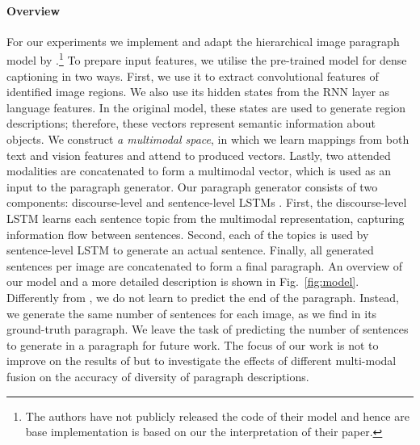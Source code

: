 \documentclass[11pt,a4paper]{article}
\begin{document}
\paragraph{Overview}
For our experiments we implement and adapt the hierarchical image paragraph model by \citet{krause2016hierarchical}.\footnote{The authors have not publicly released the code of their model and hence are base implementation is based on our the interpretation of their paper.}
To prepare input features, we utilise the pre-trained model for dense captioning \cite{densecap} in two ways.
First, we use it to extract convolutional features of identified image regions.
We also use its hidden states from the RNN layer as language features.
In the original model, these states are used to generate region descriptions; therefore, these vectors represent semantic information about objects.
We construct \textit{a multimodal space}, in which we learn mappings from both text and vision features and attend to produced vectors.
Lastly, two attended modalities are concatenated to form a multimodal vector, which is used as an input to the paragraph generator.
Our paragraph generator consists of two components: discourse-level and sentence-level LSTMs \cite{lstm97}.
First, the discourse-level LSTM learns each sentence topic from the multimodal representation, capturing information flow between sentences.
Second, each of the topics is used by sentence-level LSTM to generate an actual sentence.
Finally, all generated sentences per image are concatenated to form a final paragraph.
An overview of our model and a more detailed description is shown in Fig.~\ref{fig:model}.
Differently from \cite{krause2016hierarchical}, we do not learn to predict the end of the paragraph.
Instead, we generate the same number of sentences for each image, as we find in its ground-truth paragraph.
We leave the task of predicting the number of sentences to generate in a paragraph for future work.
The focus of our work is not to improve on the results of \cite{krause2016hierarchical} but to investigate the effects of different multi-modal fusion on the accuracy of diversity of paragraph descriptions. %
\end{document}
